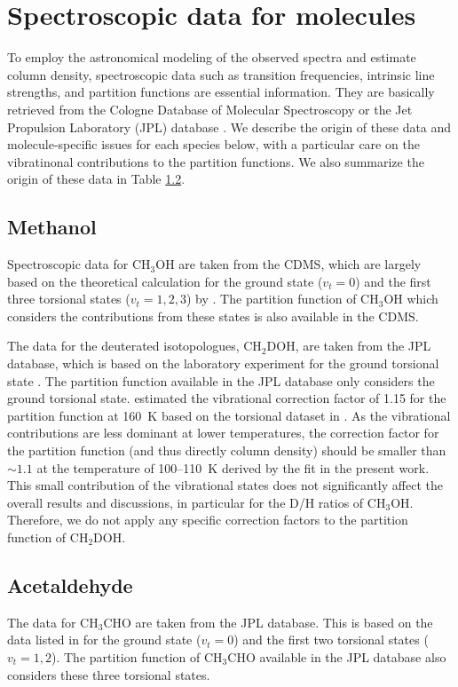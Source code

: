 \documentclass[linenumbers, twocolumn, twocolappendix, astrosymb, times]{aastex631}
\newcommand{\methanol}{CH$_3$OH\xspace}
\newcommand{\acetaldehyde}{CH$_3$CHO\xspace}
\begin{document}
\section{Spectroscopic data for molecules}\label{appendix:spectroscopic_data}
To employ the astronomical modeling of the observed spectra and estimate column density, spectroscopic data such as transition frequencies, intrinsic line strengths, and partition functions are essential information. They are basically retrieved from the Cologne
Database of Molecular Spectroscopy \citep[CDMS;][]{CDMS1, CDMS2, CDMS3} or the Jet Propulsion Laboratory (JPL) database \citep{JPL}. We describe the origin of these data and molecule-specific issues for each species below, with a particular care on the vibratinonal contributions to the partition functions. We also summarize the origin of these data in Table \ref{}.

\subsection{Methanol}
Spectroscopic data for \methanol are taken from the CDMS, which are largely based on the theoretical calculation for the ground state ($v_t = 0$) and the first three torsional states ($v_t = 1, 2, 3$) by \citet{Xu2008}. The partition function of \methanol which considers the contributions from these states is also available in the CDMS. 

The data for the deuterated isotopologues, CH$_2$DOH, are taken from the JPL database, which is based on the laboratory experiment for the ground torsional state \citep{Pearson2012}. The partition function available in the JPL database only considers the ground torsional state. \citet{Taquet2019} estimated the vibrational correction factor of 1.15 for the partition function at 160~K based on the torsional dataset in \citet{Lauvergnat2009}. As the vibrational contributions are less dominant at lower temperatures, the correction factor for the partition function (and thus directly column density) should be smaller than $\sim1.1$ at the temperature of 100--110~K derived by the fit in the present work. This small contribution of the vibrational states does not significantly affect the overall results and discussions, in particular for the D/H ratios of \methanol. Therefore, we do not apply any specific correction factors to the partition function of CH$_2$DOH.  

\subsection{Acetaldehyde}
The data for \acetaldehyde are taken from the JPL database. This is based on the data listed in \citep{Kleiner1996} for the ground state ($v_t = 0$) and the first two torsional states ($v_t = 1, 2$). The partition function of \acetaldehyde available in the JPL database also considers these three torsional states. 
\end{document}
